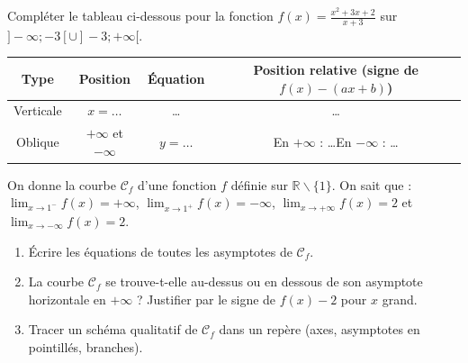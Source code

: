 \documentclass[11pt]{article}
\def\setminus{\mathbin{\backslash}}\let\smallsetminus\setminus
\begin{document}
\begin{exercice}
Compléter le tableau ci-dessous pour la fonction $f(x) = \frac{x^2+3x+2}{x+3}$ sur $]-\infty;-3[ \cup ]-3;+\infty[$.
\begin{center}
\begin{tabular}{|c|c|c|c|}
\hline
\textbf{Type} & \textbf{Position} & \textbf{Équation} & \textbf{Position relative (signe de $f(x) - (ax+b)$)} \\
\hline
Verticale & $x = \ldots$ & \ldots & \ldots \\
\hline
Oblique & $+\infty$ et $-\infty$ & $y = \ldots$ & En $+\infty$ : \ldots \quad En $-\infty$ : \ldots \\
\hline
\end{tabular}
\end{center}
\end{exercice}

\begin{exercice}
On donne la courbe $\mathcal{C}_f$ d'une fonction $f$ définie sur $\mathbb{R}\setminus\{1\}$.
On sait que : $\lim_{x \to 1^-} f(x) = +\infty$, $\lim_{x \to 1^+} f(x) = -\infty$, $\lim_{x \to +\infty} f(x) = 2$ et $\lim_{x \to -\infty} f(x) = 2$.
\begin{enumerate}
    \item Écrire les équations de toutes les asymptotes de $\mathcal{C}_f$.
    \item La courbe $\mathcal{C}_f$ se trouve-t-elle au-dessus ou en dessous de son asymptote horizontale en $+\infty$ ? Justifier par le signe de $f(x)-2$ pour $x$ grand.
    \item Tracer un schéma qualitatif de $\mathcal{C}_f$ dans un repère (axes, asymptotes en pointillés, branches).
\end{enumerate}
\end{exercice}
\end{document}
